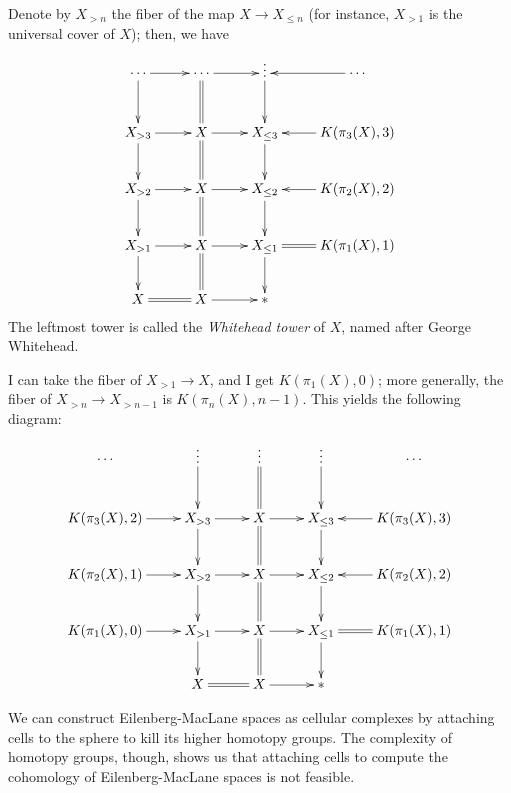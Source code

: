 Denote by $X_{>n}$ the fiber of the map $X\to X_{\leq n}$ (for instance,
$X_{>1}$ is the universal cover of $X$); then, we have
\begin{equation*}
    \xymatrix{
	\cdots\ar[r]\ar[d] & \cdots\ar[r]\ar@{=}[d] & \vdots\ar[d] &
	\cdots\ar[l]\\
	X_{>3}\ar[r]\ar[d] & X\ar[r]\ar@{=}[d] & X_{\leq 3}\ar[d]&
	K(\pi_3(X),3)\ar[l]\\
	X_{>2}\ar[r]\ar[d] & X\ar[r]\ar@{=}[d] & X_{\leq 2}\ar[d]&
	K(\pi_2(X),2)\ar[l]\\
	X_{>1}\ar[r]\ar[d] & X\ar[r]\ar@{=}[d] & X_{\leq 1}\ar@{=}[r]\ar[d] &
	K(\pi_1(X),1)\\
	X\ar@{=}[r] & X\ar[r] & \ast
    }
\end{equation*}
The leftmost tower is called the \emph{Whitehead tower} of $X$, named after
George Whitehead.

I can take the fiber of $X_{>1}\to X$, and I get $K(\pi_1(X),0)$; more
generally, the fiber of $X_{>n} \to X_{>n-1}$ is $K(\pi_n(X),n-1)$. This yields
the following diagram:
\begin{equation*}
    \xymatrix{
	\cdots & \vdots\ar[d] & \vdots\ar@{=}[d] & \vdots\ar[d] & \cdots\\
	K(\pi_3(X),2)\ar[r] & X_{>3}\ar[r]\ar[d] & X\ar[r]\ar@{=}[d] & X_{\leq
	3}\ar[d]& K(\pi_3(X),3)\ar[l]\\
	K(\pi_2(X),1)\ar[r] & X_{>2}\ar[r]\ar[d] & X\ar[r]\ar@{=}[d] & X_{\leq
	2}\ar[d]& K(\pi_2(X),2)\ar[l]\\
	K(\pi_1(X),0)\ar[r] & X_{>1}\ar[r]\ar[d] & X\ar[r]\ar@{=}[d] & X_{\leq
	1}\ar@{=}[r]\ar[d] & K(\pi_1(X),1)\\
	& X\ar@{=}[r] & X\ar[r] & \ast
    }
\end{equation*}

We can construct Eilenberg-MacLane spaces as cellular complexes by attaching
cells to the sphere to kill its higher homotopy groups. The complexity of
homotopy groups, though, shows us that attaching cells to compute the
cohomology of Eilenberg-MacLane spaces is not feasible.
